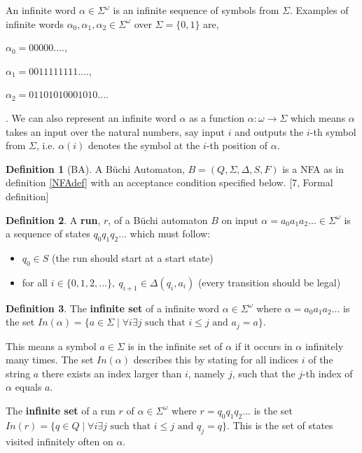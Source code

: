 \documentclass[a4paper,12pt]{report}
\theoremstyle{definition}
\newtheorem{definition}{Definition}[subsection]
\begin{document}
\noindent [10, Introduction, p.4][3]

An infinite word $\alpha \in \Sigma^\omega$ is an infinite sequence of symbols from $\Sigma$. Examples of infinite words $\alpha_0, \alpha_1, \alpha_2 \in\Sigma^\omega$ over $\Sigma=\{0,1\}$  are,
\begin{itemize*}
\item [] $\alpha_0 = 00000....$,
\item[]$\alpha_1=0011111111....$,
\item[]$\alpha_2=01101010001010....$ 
\end{itemize*}.
We can also represent an infinite word $\alpha$ as a function $\alpha:\omega \rightarrow \Sigma$ which means $\alpha$ takes an input over the natural numbers, say input $i$ and outputs the $i$-th symbol from $\Sigma$, i.e. $\alpha(i)$ denotes the symbol at the $i$-th position of $\alpha$. 


\noindent[9, Notation ,p.2][3]

\begin{definition}[BA]
\label{DefBA}
A Büchi Automaton, $B=(Q,\Sigma, \Delta, S, F)$ is a NFA  as in definition \ref{NFAdef} with an acceptance condition specified below.
[7, Formal definition]
\end{definition}

\begin{definition}
A \textbf{run}, $r$, of a Büchi automaton $B$ on input $\alpha=a_0a_1a_2... \in \Sigma^\omega$ is a sequence of states $q_0q_1q_2...$ which must follow:
\begin{itemize}
    \item $q_0\in S$ (the run should start at a start state)
    \item for all $i \in\{0,1,2,...\}, \ q_{i+1} \in \Delta(q_i,a_i) $ (every transition should be legal) 
\end{itemize}

\end{definition}
\begin{definition}
The \textbf{infinite set} of a infinite word $\alpha\in\Sigma^\omega$ where $\alpha=a_0a_1a_2...$ is the set 
$In(\alpha)=\{ a\in\Sigma \mid \forall i \exists j \text{ such that } i\leq j \text{ and } a_j=a\}$. 

This means a symbol $a\in\Sigma$ is in the infinite set of $\alpha$ if it occurs in $\alpha$ infinitely many times. The set $In(\alpha)$ describes this by stating for all indices $i$ of the string $a$ there exists an index larger than $i$, namely $j$, such that the $j$-th index of $\alpha$ equals $a$.

The \textbf{infinite set} of a run $r$ of $\alpha\in\Sigma^\omega$ where $r=q_0q_1q_2...$ is the set 
$In(r)=\{ q\in Q \mid \forall i \exists j \text{ such that } i\leq j \text{ and } q_j=q\}$. 
This is the set of states visited infinitely often on $\alpha$.

\noindent[8, lecture 2, p.2]
\end{definition}
\end{document}

